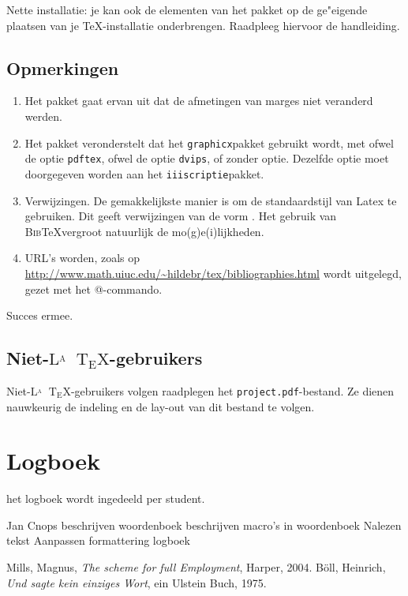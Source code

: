 \documentclass[a4paper,oneside]{report}
\def\latex{$\mathrm{L\!\!^{{}_{\scriptstyle A}} \!\!\!\!\!\;\; T\!_{\displaystyle E} \!
X}$}
\begin{document}
Nette installatie: je kan ook de elementen van het pakket op de ge"eigende plaatsen van
je \TeX-installatie onderbrengen. Raadpleeg hiervoor de handleiding.
\section{Opmerkingen}
\begin{enumerate}
\item Het pakket gaat ervan uit dat de afmetingen van marges niet veranderd werden.
\item Het pakket veronderstelt dat het {\tt graphicx}pakket gebruikt wordt, met ofwel de
optie {\tt pdftex}, ofwel de optie {\tt dvips}, of zonder optie. Dezelfde optie moet doorgegeven worden
aan het {\tt iiiscriptie}pakket.
\item Verwijzingen.
De gemakkelijkste manier is om de standaardstijl van Latex te gebruiken. Dit geeft 
verwijzingen van de vorm \cite{Mmils}.
Het gebruik van \textsc{Bib}\TeX vergroot natuurlijk de mo(g)e(i)lijkheden.
\item URL's worden, zoals op \url{http://www.math.uiuc.edu/~hildebr/tex/bibliographies.html}
wordt uitgelegd, gezet met het \verb@\url{}@-commando.
\end{enumerate}
Succes ermee.
\section{Niet-\latex-gebruikers}
Niet-\latex-gebruikers volgen raadplegen het {\tt project.pdf}-bestand. Ze
dienen nauwkeurig de indeling en de lay-out van dit bestand te volgen.

\chapter{Logboek}
het logboek wordt ingedeeld per student.
\begin{studentlog}{Jan Cnops}
{beschrijven woordenboek}
{beschrijven macro's in woordenboek}
{Nalezen tekst}
{Aanpassen formattering logboek}
\end{studentlog}

\noindent
%
%
\def\bibname{Literatuurlijst}
%
\begin{thebibliography}{9}
%
%
\addcontentsline{toc}{chapter}{\bibname}
 {\sc Mills, Magnus,} {\it The scheme for full Employment},
Harper, 2004.
 {\sc B\"oll, Heinrich,} {\it Und sagte kein einziges Wort}, ein Ulstein Buch,
1975.
\end{thebibliography}
\end{document}
